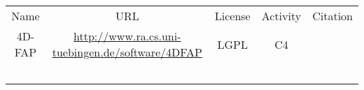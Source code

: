 \begin{table} 
    \begin{tabular}{ c c c c c }
     Name    & URL & License & Activity & Citation \\ 
     4D-FAP    &\url{http://www.ra.cs.uni-tuebingen.de/software/4DFAP} & LGPL & C4 & \cite{Jahn_2011,Jahn_2010} \\ 
         &  &  &  &  \\ 
         &  &  &  &  \\ 
         &  &  &  &  \\ 
         &  &  &  &  \\ 
         &  &  &  &  \\ 
    \end{tabular} 
\end{table}
